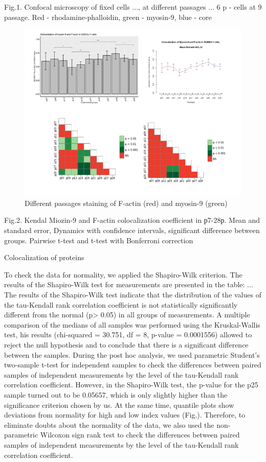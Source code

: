 \documentclass[a4paper,12pt]{article}
\begin{document}
Fig.1. Confocal microscopy of fixed cells ..., at different passages ... 6 p - cells at 9 passage. Red - rhodamine-phalloidin, green - myosin-9, blue - core

\begin{figure}[hbt!]
\centering
\includegraphics[width=0.8\linewidth]{fig2.png}
\caption{Different passages staining of F-actin (red) and myosin-9 (green)}
\label{fig:fig2}
\end{figure}

Fig.2. Kendal Miozin-9 and F-actin colocalization coefficient in р7-28р. Mean and standard error, Dynamics with confidence intervals, significant difference between groups. Pairwise t-test and t-test with Bonferroni correction

Colocalization of proteins

To check the data for normality, we applied the Shapiro-Wilk criterion.
The results of the Shapiro-Wilk test for measurements are presented in the table:
...
The results of the Shapiro-Wilk test indicate that the distribution of the values of the tau-Kendall rank correlation coefficient is not statistically significantly different from the normal (p> 0.05) in all groups of measurements. A multiple comparison of the medians of all samples was performed using the Kruskal-Wallis test, his results (chi-squared = 30.751, df = 8, p-value = 0.0001556) allowed to reject the null hypothesis and to conclude that there is a significant difference between the samples.
 During the post hoc analysis, we used parametric Student’s two-sample t-test for independent samples to check the differences between paired samples of independent measurements by the level of the tau-Kendall rank correlation coefficient.
However, in the Shapiro-Wilk test, the p-value for the p25 sample turned out to be 0.05657, which is only slightly higher than the significance criterion chosen by us. At the same time, quantile plots show deviations from normality for high and low index values (Fig.).
Therefore, to eliminate doubts about the normality of the data, we also used the non-parametric Wilcoxon sign rank test to check the differences between paired samples of independent measurements by the level of the tau-Kendall rank correlation coefficient.
\end{document}
